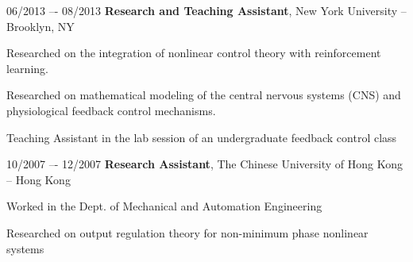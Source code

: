 \begin{twocolentry}{06/2013 –- 08/2013}
\textbf{Research and Teaching Assistant}, New York University -- Brooklyn, NY\end{twocolentry}
\vspace{0.10 cm}
\begin{onecolentry}
\begin{highlights}

\item Researched on the integration of nonlinear control theory with reinforcement learning.

\item Researched on mathematical modeling of the central nervous systems (CNS) and physiological feedback control mechanisms.

\item Teaching Assistant in the lab session of an undergraduate feedback control class
\end{highlights}
\end{onecolentry}
\vspace{0.25 cm}


\begin{twocolentry}{10/2007 –- 12/2007}
\textbf{Research Assistant}, The Chinese University of Hong Kong -- Hong Kong\end{twocolentry}
\vspace{0.10 cm}
\begin{onecolentry}
\begin{highlights}
\item Worked in the Dept. of Mechanical and Automation Engineering
\item Researched on output regulation theory for non-minimum phase nonlinear systems
\end{highlights}
\end{onecolentry}
\vspace{0.25 cm}